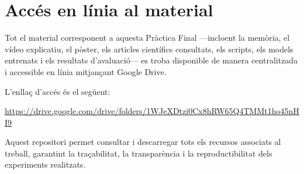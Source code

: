 \documentclass[11pt,a4paper]{article}
\begin{document}
\section{Accés en línia al material}

Tot el material corresponent a aquesta Pràctica Final —incloent la memòria,
el vídeo explicatiu, el pòster, els articles científics consultats, els scripts,
els models entrenats i els resultats d’avaluació— es troba disponible de manera
centralitzada i accessible en línia mitjançant Google Drive.

L’enllaç d’accés és el següent:

\begin{center}
\url{https://drive.google.com/drive/folders/1WJeXDtzi0Cx8hRW65Q4TMMt1ho45nHI9}
\end{center}

Aquest repositori permet consultar i descarregar tots els recursos associats
al treball, garantint la traçabilitat, la transparència i la reproductibilitat
dels experiments realitzats.
\end{document}
